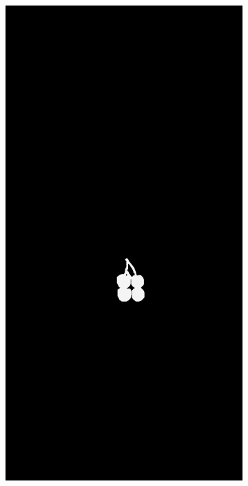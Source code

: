 \begin{figure}[H]
\begin{subfigure}[b]{\textwidth}
\begin{minipage}{0.45\textwidth}
            \includegraphics[width=\textwidth]{figures/appendix/appendix_DRAEM/JB/139_m.png}

\end{minipage}
\end{subfigure}
\end{figure}
